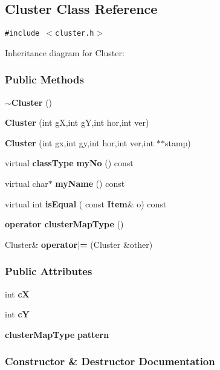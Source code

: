 \subsection{Cluster  Class Reference}
\label{Cluster}
{\tt \#include $<$cluster.h$>$}

Inheritance diagram for Cluster:\begin{figure}[H]
\begin{center}
\leavevmode
\setlength{\epsfysize}{4cm}
\end{center}
\end{figure}
\subsubsection*{Public Methods}
\begin{CompactItemize}
\item 
{\bf $\sim$Cluster} ()
\item 
{\bf Cluster} (int g\-X,int g\-Y,int hor,int ver)
\item 
{\bf Cluster} (int gx,int gy,int hor,int ver,int $\ast$$\ast$stamp)
\item 
virtual {\bf class\-Type} {\bf my\-No} () const
\item 
virtual char$\ast$ {\bf my\-Name} () const
\item 
virtual int {\bf is\-Equal} ( const {\bf Item}\& o) const
\item 
{\bf operator cluster\-Map\-Type} ()
\item 
Cluster\& {\bf operator$|$=} (Cluster \&other)
\end{CompactItemize}
\subsubsection*{Public Attributes}
\begin{CompactItemize}
\item 
int {\bf c\-X}
\item 
int {\bf c\-Y}
\item 
{\bf cluster\-Map\-Type} {\bf pattern}
\end{CompactItemize}


\subsubsection{Constructor \& Destructor Documentation}
\label{Cluster_a0}
